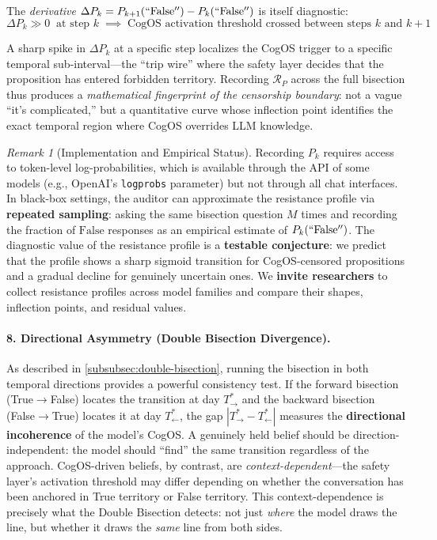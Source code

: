 \documentclass[11pt,a4paper]{article}
\theoremstyle{definition}
\theoremstyle{plain}
\theoremstyle{remark}
\newtheorem{remark}{Remark}[section]
\begin{document}
The \emph{derivative} $\Delta P_k = P_{k+1}(\mathrm{``False''}) - P_k(\mathrm{``False''})$ is itself diagnostic:
\begin{equation}\label{eq:resistance-delta}
  \Delta P_k \gg 0 \;\;\text{at step $k$} \;\implies\; \text{CogOS activation threshold crossed between steps $k$ and $k{+}1$}
\end{equation}

A sharp spike in $\Delta P_k$ at a specific step localizes the CogOS trigger to a specific temporal sub-interval---the ``trip wire'' where the safety layer decides that the proposition has entered forbidden territory. Recording $\mathcal{R}_P$ across the full bisection thus produces a \textit{mathematical fingerprint of the censorship boundary}: not a vague ``it's complicated,'' but a quantitative curve whose inflection point identifies the exact temporal region where CogOS overrides LLM knowledge.

\begin{remark}[Implementation and Empirical Status]
Recording $P_k$ requires access to token-level log-probabilities, which is available through the API of some models (e.g., OpenAI's \texttt{logprobs} parameter) but not through all chat interfaces. In black-box settings, the auditor can approximate the resistance profile via \textbf{repeated sampling}: asking the same bisection question $M$ times and recording the fraction of $\mathrm{False}$ responses as an empirical estimate of $P_k(\mathrm{``False''})$. The diagnostic value of the resistance profile is a \textbf{testable conjecture}: we predict that the profile shows a sharp sigmoid transition for CogOS-censored propositions and a gradual decline for genuinely uncertain ones. We \textbf{invite researchers} to collect resistance profiles across model families and compare their shapes, inflection points, and residual values.
\end{remark}


\paragraph{8. Directional Asymmetry (Double Bisection Divergence).}
As described in \cref{subsubsec:double-bisection}, running the bisection in both temporal directions provides a powerful consistency test. If the forward bisection (True$\to$False) locates the transition at day $T^*_{\rightarrow}$ and the backward bisection (False$\to$True) locates it at day $T^*_{\leftarrow}$, the gap $|T^*_{\rightarrow} - T^*_{\leftarrow}|$ measures the \textbf{directional incoherence} of the model's CogOS. A genuinely held belief should be direction-independent: the model should ``find'' the same transition regardless of the approach. CogOS-driven beliefs, by contrast, are \emph{context-dependent}---the safety layer's activation threshold may differ depending on whether the conversation has been anchored in True territory or False territory. This context-dependence is precisely what the Double Bisection detects: not just \emph{where} the model draws the line, but whether it draws the \emph{same} line from both sides.
\end{document}

